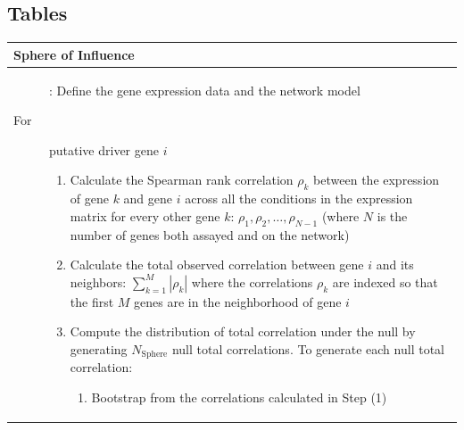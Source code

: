 \documentclass[11pt]{article}
\begin{document}



\clearpage

\subsection*{Tables}



\begin{table}[hb!]
\centering
  
\begin{tabular}{ p{\textwidth } }
  \hline
  
  \textbf{Sphere of Influence} \\
  \hline

 
  \begin{description}

    \item[\textbf{Input}]: Define the gene expression data and the network model

    \item[For] putative driver gene $i$ 

    \begin{enumerate}

        \item Calculate the Spearman rank correlation $\rho_k$ between the 
        	  expression of gene $k$ and gene $i$ across all the conditions
        	  in the expression matrix for every other gene $k$: 
            $\rho_1,\rho_2,\dots,\rho_{N-1}$
            (where $N$ is the number of genes both assayed and on the
            network)

       	\item Calculate the total observed correlation between gene $i$
       		  and its neighbors: $\sum_{k=1}^{M} |\rho_k|$ where the correlations
       		  $\rho_k$ are indexed so that the first $M$ genes are in the
       		  neighborhood of gene $i$

       	\item Compute the distribution of total correlation under the null by
       		    generating $N_{\text{Sphere}}$ null total correlations. To
              generate each null total correlation:

        \begin{enumerate}

            \item Bootstrap from the correlations calculated in Step (1)


\end{enumerate}
\end{enumerate}
\end{description}
\end{tabular}
\end{table}
\end{document}
